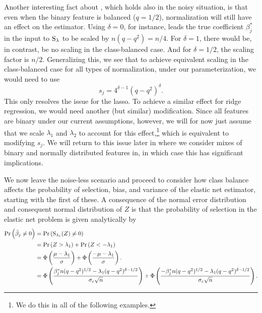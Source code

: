 Another interesting fact about , which holds also in the noisy situation, is that even when the binary feature is balanced (\(q = 1/2\)), normalization will still have an effect on the estimator.
Using \(\delta = 0\), for instance, leads the true coefficient \(\beta_j^*\) in the input to \(\operatorname{S}_\lambda\) to be scaled by \(n (q - q^2) = n/4\). For \(\delta = 1\), there would be, in contrast, be no scaling in the class-balanced case. And for \(\delta = 1/2\), the scaling factor is \(n/2\). Generalizing this, we see that to achieve equivalent scaling in the class-balanced case for all types of normalization, under our parameterization, we would need to use
\[
  s_j = 4^{\delta - 1} (q - q^2)^\delta.
\]
This only resolves the issue for the lasso.
To achieve a similar effect for ridge regression, we would need another (but similar) modification.
Since all features are binary under our current assumptions, however, we will for now just assume that we scale \(\lambda_1\) and \(\lambda_2\) to account for this effect,\footnote{We do this in all of the following examples.} which is equivalent to modifying \(s_j\). We will return to this issue later in  where we consider mixes of binary and normally distributed features in, in which case this has significant implications.


We now leave the noise-less scenario and proceed to consider how class balance affects the probability of selection, bias, and variance of the elastic net estimator, starting with the first of these. A consequence of the normal error distribution and consequent normal distribution of \(Z\) is that the probability of selection in the elastic net problem is given analytically by
\begin{align*}
  \Pr\left(\hat{\beta}_j \neq 0\right) & = \Pr\left(\operatorname{S}_{\lambda_1}(Z) \neq 0\right)                                                                                                                                                                                                               \\
                                       & = \Pr\left(Z > \lambda_1\right) + \Pr\left(Z < -\lambda_1\right)                                                                                                                                                                                          \\
                                       & = \operatorname{\Phi}\left(\frac{\mu - \lambda_1}{\sigma}\right) + \operatorname{\Phi}\left(\frac{- \mu -\lambda_1}{\sigma}\right).                                                                                                                                                     \\
                                       & = \operatorname{\Phi} \left( \frac{\beta_j^*n (q-q^2)^{1/2} - \lambda_1(q-q^2)^{\delta - 1/2}}{\sigma_\varepsilon \sqrt{n}}\right)                 + \operatorname{\Phi} \left( \frac{-\beta_j^*n (q-q^2)^{1/2} - \lambda_1(q-q^2)^{\delta - 1/2}}{\sigma_\varepsilon \sqrt{n}}\right).
\end{align*}


